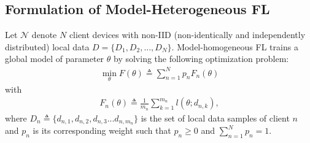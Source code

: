 \documentclass{article}
\newcommand{\Luyang}[1]{\textcolor{orange}{(Luyang: #1)}}
\begin{document}
\subsection{Formulation of Model-Heterogeneous FL}
\vspace{-2mm}
Let $\mathcal{N}$ denote $N$ client devices with non-IID (non-identically and independently distributed) local data $D=\{D_1, D_2, ..., D_N\}$. %
Model-homogeneous FL trains a global model of parameter $\theta$ by solving the following optimization problem:
\begin{align}
\min_{\theta}  
 F \left( \theta \right)  \triangleq \sum_{n=1}^N p_n F_n(\theta)  \label{eq:FL}
\end{align}
with 
\begin{align}
    F_n(\theta) \triangleq \frac{1}{m_n} \sum_{k=1}^{m_n} l(\theta; d_{n,k}),
\end{align}
where $D_n \triangleq \{d_{n, 1}, d_{n,2}, d_{n,3} ... d_{n, m_n}\}$ is the set of local data samples of client $n$
and $p_n$ is its corresponding weight such that $ p_n\geq 0$ and $\sum_{n=1}^Np_n = 1$. 




% 
\end{document}
